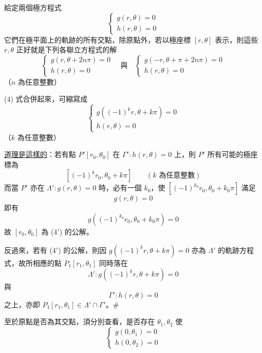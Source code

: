 \medskip
\setcounter{theorem}{0}
\begin{theorem}\label{thm:b5s-1-4-1}
給定兩個極方程式
\begin{equation}
\begin{cases}
g(r, \theta) = 0 \\[4pt]
h(r, \theta) = 0
\end{cases}
\tag{3}
\end{equation}
它們在極平面上的軌跡的所有交點，除原點外，若以極座標 $[r, \theta]$ 表示，則這些 $r, \theta$ 正好就是下列各聯立方程式的解
\begin{equation}
\begin{cases}
g(r, \theta + 2n\pi) = 0 \\[4pt]
h(r, \theta) = 0
\end{cases}
\quad \text{與} \quad
\begin{cases}
g(-r, \theta + \pi + 2n\pi) = 0 \\[4pt]
h(r, \theta) = 0
\end{cases}
\tag{4}
\end{equation}
（$n$ 為任意整數）

(4) 式合併起來，可縮寫成
\begin{equation}
\begin{cases}
g((-1)^k r, \theta + k\pi) = 0 \\[4pt]
h(r, \theta) = 0
\end{cases}
\tag{4$'$}
\end{equation}
（$k$ 為任意整數）
\end{theorem}

\noindent\underline{道理是這樣的}：若有點 $P'[r_0, \theta_0]$ 在 $\Gamma' : h(r, \theta) = 0$ 上，則 $P'$ 所有可能的極座標為
\[
[(-1)^k r_0, \theta_0 + k\pi] \qquad (\text{$k$ 為任意整數})
\]
而當 $P'$ 亦在 $\Lambda' : g(r, \theta) = 0$ 時，必有一個 $k_0$，使 $[(-1)^{k_0} r_0, \theta_0 + k_0\pi]$ 滿足
\[
g(r, \theta) = 0
\]
即有
\[
g((-1)^{k_0} r_0, \theta_0 + k_0\pi) = 0
\]
故 $[r_0, \theta_0]$ 為 (4$'$) 的公解。

反過來，若有 (4$'$) 的公解，則因 $g((-1)^k r, \theta + k\pi) = 0$ 亦為 $\Lambda'$ 的軌跡方程式，故所相應的點 $P_1[r_1, \theta_1]$ 同時落在
\[
\Lambda' : g((-1)^k r, \theta + k\pi) = 0
\]
與
\[
\Gamma' : h(r, \theta) = 0
\]
之上，亦即 $P_1[r_1, \theta_1] \in \Lambda' \cap \Gamma'$。\hfill$\#$

至於原點是否為其交點，須分別查看，是否存在 $\theta_1, \theta_2$ 使
\[
\begin{cases}
g(0, \theta_1) = 0 \\[4pt]
h(0, \theta_2) = 0
\end{cases}
\]

